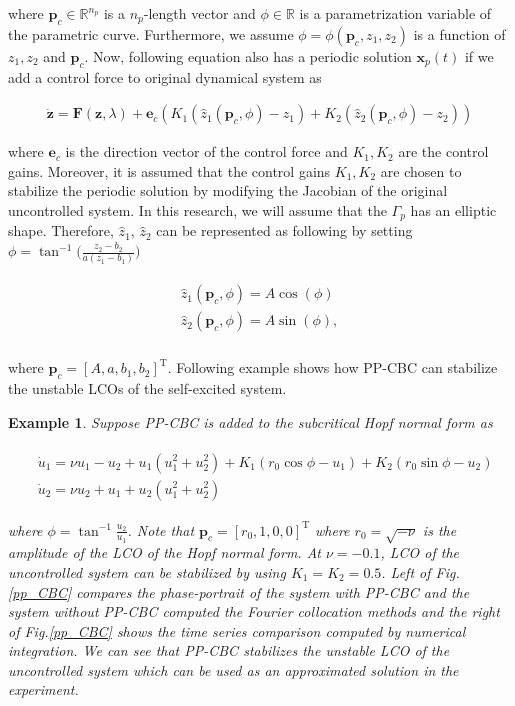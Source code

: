 \documentclass[openacc]{rsproca_new}%
\theoremstyle{own}
\newtheorem{example}{Example}[section]
\def\vec#1{\ensuremath{\mathbf{#1}}}
\begin{document}
\noindent where $\vec p_c\in \mathbb{R}^{n_p}$ is a $n_p$-length vector and $\phi \in \mathbb{R}$ is a parametrization variable of the parametric curve. Furthermore, we assume $\phi=\phi(\vec p_c,z_1,z_2)$ is a function of $z_1,z_2$ and $\vec p_c$. Now, following equation also has a periodic solution $\vec x_{p}(t)$ if we add a control force to original dynamical system as

\begin{align}\label{CBC+}
\dot{\vec{z}}= \vec F(\vec{z},\lambda)+\vec e_c (K_1(\hat z_1(\vec p_c,\phi)-z_1)+ K_2(\hat z_2(\vec p_c,\phi) -z_2))
\end{align}

\noindent where $\vec e_c$ is the direction vector of the control force and $K_1, K_2$ are the control gains. Moreover, it is assumed that the control gains $K_1,K_2$ are chosen to stabilize the periodic solution by modifying the Jacobian of the original uncontrolled system. In this research, we will assume that the $\Gamma_p$ has an elliptic shape. Therefore, $\hat z_1$, $\hat z_2$ can be represented as following by setting $\phi=\tan^{-1}\Big(\frac{z_2-b_2}{a(z_1-b_1)}\Big)$

\begin{align}\label{PP_curve2}
	\begin{split}
\hat z_1(\vec p_c,\phi)=A\cos(\phi)\\
\hat z_2(\vec p_c,\phi)=A\sin(\phi),\\
\end{split}
\end{align}

\noindent where $\vec p_c=[A,a,b_1,b_2]^\textrm{T}$. Following example shows how PP-CBC can stabilize the unstable LCOs of the self-excited system.

\begin{example}
Suppose PP-CBC is added to the subcritical Hopf normal form as

\begin{align}\label{PP_HopfNF}
	\begin{split}
&\dot u_1=\nu u_1 -u_2+u_1(u_1^2+u_2^2)+K_1(r_0 \cos \phi-u_1)+K_2(r_0 \sin \phi-u_2)\\
&\dot u_2=\nu u_2 +u_1+u_2(u_1^2+u_2^2)
\end{split}
\end{align}

\noindent where $\phi=\tan^{-1}\frac{u_2}{u_1}$. Note that $\vec p_c=[r_0,1,0,0]^\textrm{T}$ where $r_0=\sqrt{-\nu}$ is the amplitude of the LCO of the Hopf normal form. At $\nu=-0.1$, LCO of the uncontrolled system can be stabilized by using $K_1=K_2=0.5$. Left of Fig.\ref{pp_CBC} compares the phase-portrait of the system with PP-CBC and the system without PP-CBC computed the Fourier collocation methods and the right of Fig.\ref{pp_CBC} shows the time series comparison computed by numerical integration. We can see that PP-CBC stabilizes the unstable LCO of the uncontrolled system which can be used as an approximated solution in the experiment.
\end{example}
\end{document}
